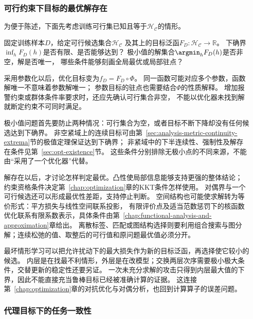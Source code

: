 \subsubsection{可行约束下目标的最优解存在}
\label{sec:future-analysis-minimizer}

为便于陈述，下面先考虑训练可行集已知且等于$\mathcal H_{\mathcal C}$的情形。

\begin{mathproblem}[目标泛函的极小值与解]
  \label{question:future-minimizer}
  固定训练样本$D$，给定可行候选集合$\mathcal H_{\mathcal C}$
  及其上的目标泛函$F_D:\mathcal H_{\mathcal C}\to\mathbb R$。
  下确界$\inf_hF_D(h)$是否有限、是否能够达到？
  极小值的解集合$\argmin_hF_D(h)$是否非空，解是否唯一，
  哪些条件能够刻画全局最优或局部驻点？
\end{mathproblem}

采用参数化以后，优化目标变为$f_D=F_D\circ\Phi$。
同一函数可能对应多个参数，函数解唯一不意味着参数解唯一；
参数目标的驻点也需要结合$\Phi$的性质解释。
增加报警约束或群体条件率要求时，还应先确认可行集合非空，
不能以优化器未找到解就断定约束不可同时满足。

极小值问题首先要防止两种情况：可行集合为空，或者目标不断下降却没有任何候选达到下确界。
非空紧域上的连续目标可由第~\ref{sec:analysis-metric-continuity-extrema}节的极值定理保证达到下确界；
非紧域中的下半连续性、强制性及解存在条件见第~\ref{sec:opt-existence}节。
这些条件分别排除无极小点的不同来源，不能由“采用了一个优化器”代替。

解存在以后，才讨论怎样判定最优。凸性使局部信息能够支持更强的整体结论；
约束资格条件决定第~\ref{chap:optimization}章的KKT条件怎样使用。
对偶界与一个可行候选还可以形成最优性差距，支持停止判断。
空间结构也可能使求解转为等价形式：平方损失与线性空间联系投影，
有限评价点及适当范数惩罚下的核函数优化联系有限系数表示，具体条件由第~\ref{chap:functional-analysis-and-approximation}章给出。
离散标签、匹配或图结构选择则要利用组合搜索与图分解；连续松弛的值、取整后的可行值和原问题最优值必须分开。

最坏情形学习可以把允许扰动下的最大损失作为新的目标泛函，再选择使它较小的候选。
内层是在找最不利情形，外层是在改模型；交换两层次序需要极小极大条件，交替更新的稳定性还要另证。
一次未充分求解的攻击只得到内层最大值的下界，因此不能直接充当鲁棒目标已经被准确计算的证据。
这连接第~\ref{chap:optimization}章的对抗优化与对偶分析，也回到计算算子的误差问题。

\subsubsection{代理目标下的任务一致性}
\label{sec:future-analysis-proxy-risk}

